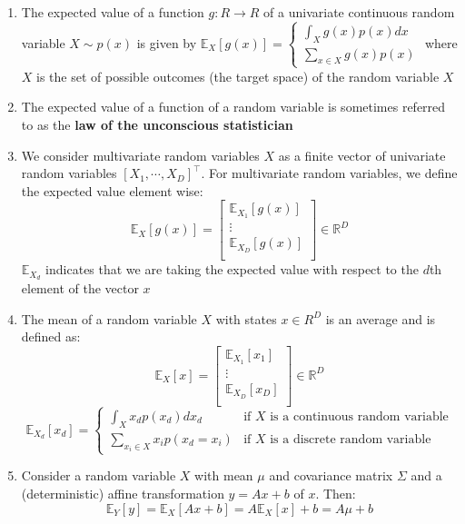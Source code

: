 \begin{enumerate}
    \item The expected value of a function $g : R \to R$ of a univariate continuous random variable $X \sim p(x)$ is given by $
        \mathbb{E}_X[g(x)] = 
        \begin{cases}
            \displaystyle\int_X g(x)p(x)dx \\[2ex]
            \displaystyle\sum_{x\in X} g(x)p(x)
        \end{cases}
    $ where $X$ is the set of possible outcomes (the target space) of the random variable $X$

    \item The expected value of a function of a random variable is sometimes referred to as the \textbf{law of the unconscious statistician}

    \item We consider multivariate random variables $X$ as a finite vector of univariate random variables $[X_1, \cdots , X_D]^\top$. For multivariate random variables, we define the expected value element wise:
    \[
        \mathbb{E}_X[g(x)]
        = \begin{bmatrix}
            \mathbb{E}_{X_1}[g(x)] \\
            \vdots \\
            \mathbb{E}_{X_D}[g(x)] \\
        \end{bmatrix} \in \mathbb{R}^D
    \]
    $\mathbb{E}_{X_d}$ indicates that we are taking the expected value with respect to the $d$th element of the vector $x$

    \item The mean of a random variable $X$ with states $x \in R^D$ is an average and is defined as: \cite{mfml-1}
    \[
        \mathbb{E}_X[x]
        = \begin{bmatrix}
            \mathbb{E}_{X_1}[x_1] \\
            \vdots \\
            \mathbb{E}_{X_D}[x_D] \\
        \end{bmatrix} \in \mathbb{R}^D
    \]
    \[
        \mathbb{E}_{X_d}[x_d]
        = \begin{cases}
            \displaystyle\int_X x_d p(x_d) dx_d
            & \text{if $X$ is a continuous random variable}\\[2ex]
            \displaystyle\sum_{x_i \in X} x_i p(x_d=x_i)
            & \text{if $X$ is a discrete random variable}
        \end{cases}
    \]

    \item Consider a random variable $X$ with mean $\mu$ and covariance matrix $\Sigma$ and a (deterministic) affine transformation $y = Ax + b$ of $x$. Then:
    \[
        \mathbb{E}_Y[y] 
        = \mathbb{E}_X[Ax + b] 
        = A\mathbb{E}_X[x] + b 
        = A\mu + b
    \]
\end{enumerate}

